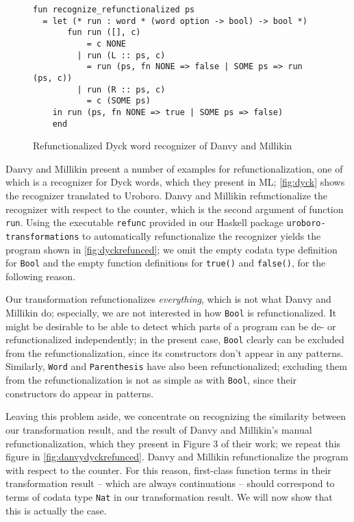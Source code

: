\begin{figure}
\begin{lstlisting}
fun recognize_refunctionalized ps
  = let (* run : word * (word option -> bool) -> bool *)
       fun run ([], c) 
           = c NONE
         | run (L :: ps, c)
           = run (ps, fn NONE => false | SOME ps => run (ps, c))
         | run (R :: ps, c)
           = c (SOME ps)
    in run (ps, fn NONE => true | SOME ps => false)
    end
\end{lstlisting}
\caption{Refunctionalized Dyck word recognizer of Danvy and Millikin}
\label{fig:danvydyckrefunced}
\end{figure}

Danvy and Millikin\cite{danvy09refunctionalization} present a number of examples for refunctionalization, one of which is a recognizer for Dyck words, which they present in ML; \autoref{fig:dyck} shows the recognizer translated to Uroboro. Danvy and Millikin refunctionalize the recognizer with respect to the counter, which is the second argument of function \texttt{run}. Using the executable \texttt{refunc} provided in our Haskell package \texttt{uroboro-transformations} to automatically refunctionalize the recognizer yields the program shown in \autoref{fig:dyckrefunced}; we omit the empty codata type definition for \texttt{Bool} and the empty function definitions for \texttt{true()} and \texttt{false()}, for the following reason.

Our transformation refunctionalizes \textit{everything}, which is not what Danvy and Millikin do; especially, we are not interested in how \texttt{Bool} is refunctionalized. It might be desirable to be able to detect which parts of a program can be de- or refunctionalized independently; in the present case, \texttt{Bool} clearly can be excluded from the refunctionalization, since its constructors don't appear in any patterns. Similarly, \texttt{Word} and \texttt{Parenthesis} have also been refunctionalized; excluding them from the refunctionalization is not as simple as with \texttt{Bool}, since their constructors do appear in patterns.

Leaving this problem aside, we concentrate on recognizing the similarity between our transformation result, and the result of Danvy and Millikin's manual refunctionalization, which they present in Figure 3 of their work; we repeat this figure in \autoref{fig:danvydyckrefunced}. Danvy and Millikin refunctionalize the program with respect to the counter. For this reason, first-class function terms in their transformation result -- which are always continuations -- should correspond to terms of codata type \texttt{Nat} in our transformation result. We will now show that this is actually the case.

